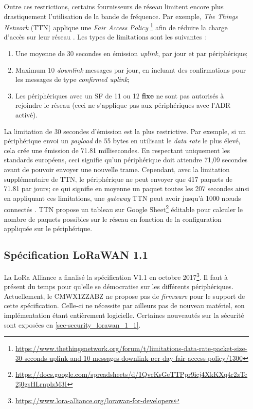 Outre ces restrictions, certains fournisseurs de réseau limitent encore plus drastiquement l'utilisation de la bande de fréquence. Par exemple, \textit{The Things Network} (TTN) applique une \textit{Fair Access Policy} \footnote{\url{https://www.thethingsnetwork.org/forum/t/limitations-data-rate-packet-size-30-seconds-uplink-and-10-messages-downlink-per-day-fair-access-policy/1300}} afin de réduire la charge d'accès sur leur réseau \cite{Limitati95:online}. Les types de limitations sont les suivantes : 
\begin{enumerate}
    \item Une moyenne de 30 secondes en émission \textit{uplink}, par jour et par périphérique;
    \item Maximum 10 \textit{downlink} messages par jour, en incluant des confirmations pour les messages de type \textit{confirmed uplink};
    \item Les périphériques avec un SF de 11 ou 12 \textbf{fixe} ne sont pas autorisés à rejoindre le réseau (ceci ne s'applique pas aux périphériques avec l'ADR activé).
\end{enumerate}

La limitation de 30 secondes d'émission est la plus restrictive. Par exemple, si un périphérique envoi un \textit{payload} de 55 bytes en utilisant le \textit{data rate} le plus élevé, cela crée une émission de 71.81 millisecondes\cite{Limitati95:online}. En respectant uniquement les standards européens, ceci signifie qu'un périphérique doit attendre 71,09 secondes avant de pouvoir envoyer une nouvelle trame. Cependant, avec la limitation supplémentaire de TTN, le périphérique ne peut envoyer que 417 paquets de 71.81 par jours; ce qui signifie en moyenne un paquet toutes les 207 secondes ainsi en appliquant ces limitations, une \textit{gateway} TTN peut avoir jusqu'à 1000 n\oe uds connectés \cite{Limitati95:online}. TTN propose un tableau sur Google Sheet\footnote{\url{https://docs.google.com/spreadsheets/d/1QvcKsGeTTPpr9icj4XkKXq4r2zTc2j0gsHLrnplzM3I}} éditable pour calculer le nombre de paquets possibles sur le réseau en fonction de la configuration appliquée sur le périphérique.

\subsection{Spécification LoRaWAN 1.1}
\label{sec-protocols_lorawan_spec_1_1}

La LoRa Alliance a finalisé la spécification V1.1 en octobre 2017\footnote{\url{https://www.lora-alliance.org/lorawan-for-developers}}. Il faut à présent du temps pour qu'elle se démocratise sur les différents périphériques. Actuellement, le CMWX1ZZABZ ne propose pas de \textit{firmware} pour le support de cette spécification. Celle-ci ne nécessite par ailleurs pas de nouveau matériel, son implémentation étant entièrement logicielle. Certaines nouveautés sur la sécurité sont exposées en \cref{sec-security_lorawan_1_1}. 

